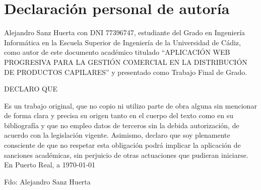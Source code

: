 \newpage{\ }
\thispagestyle{empty}

\clearpage\setcounter{page}{-1} %

\chapter*{Declaración personal de autoría}

\vspace{15mm}

\noindent Alejandro Sanz Huerta con DNI 77396747, estudiante del Grado en Ingeniería Informática en la Escuela Superior de Ingeniería de la Universidad de Cádiz, como autor de este documento académico titulado ``APLICACIÓN WEB PROGRESIVA PARA LA GESTIÓN COMERCIAL EN LA DISTRIBUCIÓN DE PRODUCTOS CAPILARES'' y presentado como Trabajo Final de Grado.
\vspace{15mm}


DECLARO QUE \\
\vspace{1mm}

\noindent Es un trabajo original, que no copio ni utilizo parte de obra alguna sin mencionar de forma clara y precisa su origen tanto en el cuerpo del texto como en su bibliografía y que no empleo datos de terceros sin la debida autorización, de acuerdo con la legislación vigente. Asimismo, declaro que soy plenamente consciente de que no respetar esta obligación podrá implicar  la  aplicación de sanciones académicas, sin perjuicio de otras actuaciones que pudieran iniciarse.
En Puerto Real, a \today 

\vspace{15mm}
Fdo: Alejandro Sanz Huerta\hspace{10cm}

